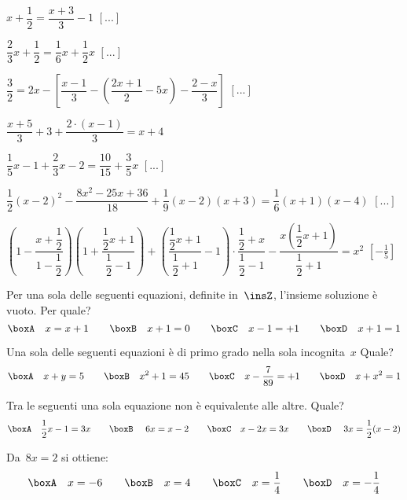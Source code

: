 \begin{esercizio}[\Ast]
\begin{enumeratea}
 \item $x+\dfrac{1}{2}=\dfrac{x+3}{3}-1$
  \hfill $\left[...\right]$
 \item $\dfrac{2}{3}x+\dfrac{1}{2}=\dfrac{1}{6}x+\dfrac{1}{2}x$
  \hfill $\left[...\right]$
 \item $\dfrac{3}{2}=2x-\left[\dfrac{x-1}{3}-
        \left(\dfrac{2x+1}{2}-5x\right)-\dfrac{2-x}{3}\right]$
  \hfill $\left[...\right]$
 \item $\dfrac{x+5}{3}+3+\dfrac{2\cdot \left(x-1\right)}{3}=x+4$
 \item $\dfrac{1}{5}x-1+\dfrac{2}{3}x-2=\dfrac{10}{15}+\dfrac{3}{5}x$
  \hfill $\left[...\right]$
 \item $\dfrac{1}{2}(x-2)^{2}-\dfrac{8x^{2}-25x+36}{18}+\dfrac{1}{9}(x-2)(x+3)=
        \dfrac{1}{6}(x+1)(x-4)$
  \hfill $\left[...\right]$
 \item $\left(1-\dfrac{x+\dfrac{1}{2}}{1-\dfrac{1}{2}}\right)
        \left(1+\dfrac{\dfrac{1}{2}x+1}{\dfrac{1}{2}-1}\right)+
        \left(\dfrac{\dfrac{1}{2}x+1}{\dfrac{1}{2}+1}-1\right)\cdot 
        {\dfrac{\dfrac{1}{2}+x}{\dfrac{1}{2}-1}}-
        \dfrac{x\left(\dfrac{1}{2}x+1\right)}{\dfrac{1}{2}+1}=x^{2}$
  \hfill $\left[-{\frac{1}{5}}\right]$
\end{enumeratea}
\end{esercizio}

\begin{esercizio}
\label{ese:13.44}
Per una sola delle seguenti equazioni, definite in~$\insZ$, l'insieme soluzione 
è vuoto. Per quale?
\[\boxA\quad x=x+1\qquad\boxB\quad x+1=0\qquad\boxC\quad x-1=+1\qquad\boxD\quad 
x+1=1\]
\end{esercizio}

\begin{esercizio}
\label{ese:13.45}
Una sola delle seguenti equazioni è di primo grado nella sola incognita~$x$ 
Quale?
\[\boxA\quad x+y=5\qquad\boxB\quad x^{2}+1=45\qquad\boxC\quad 
x-\dfrac{7}{89}=+1\qquad\boxD\quad x+x^{2}=1\]
\end{esercizio}

\begin{esercizio}
\label{ese:13.46}
Tra le seguenti una sola equazione non è equivalente alle altre. Quale?
\[\boxA\quad \dfrac{1}{2}x-1=3x\qquad\boxB\quad~6x=x-2\qquad\boxC\quad 
x-2x=3x\qquad\boxD\quad~3x=\dfrac{1}{2}(x-2)\]
\end{esercizio}

\begin{esercizio}
\label{ese:13.47}
Da~$8x=2$ si ottiene:
\[\boxA\quad x=-6\qquad\boxB\quad x=4\qquad\boxC\quad 
x=\dfrac{1}{4}\qquad\boxD\quad x=-{\dfrac{1}{4}}\]
\end{esercizio}

